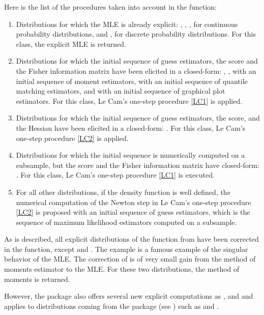 Here is the list of the procedures taken into account in the  function:
\begin{enumerate}
\item Distributions for which the MLE is already explicit: , , ,  for continuous probability distributions, and ,  for discrete probability distributions. For this class, the explicit MLE is returned.
\item Distributions for which the initial sequence of guess estimators, the score and the Fisher information matrix have been elicited in a closed-form: , ,  with an initial sequence of moment estimators,  with an initial sequence of quantile matching estimators, and  with an initial sequence of graphical plot estimators. For this class, Le Cam's one-step procedure \eqref{LC1} is applied.
\item Distributions for which the initial sequence of guess estimators, the score, and the Hessian have been elicited in a closed-form: . For this class, Le Cam's one-step procedure \eqref{LC2} is applied.
\item Distributions for which the initial sequence is numerically computed on a subsample, but the score and the Fisher information matrix have closed-form: . For this class,  Le Cam's one-step procedure \eqref{LC1} is executed.
\item For all other distributions, if the density function is well defined, the numerical computation of the Newton step in  Le Cam's one-step procedure \eqref{LC2} is proposed with an initial sequence of guess estimators, which is the sequence of maximum likelihood estimators computed on a subsample.
\end{enumerate}


As is described, all explicit distributions of the  function from
 have been corrected in the  function, except
 and . The example  is a famous example of the singular behavior of the MLE. The correction of  is of very small gain from the method of moments estimator to the MLE. For these two distributions, the method of moments is returned.

However, the package also offers several new explicit computations as ,  and  and applies to distributions coming from the  package (see \cite{actuar08}) 
such as  and .

